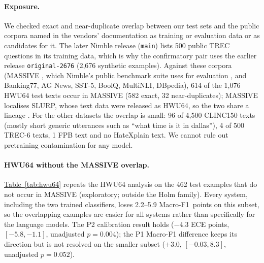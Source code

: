 \paragraph{Exposure.} We checked exact and near-duplicate overlap between our test sets and the public corpora named
in the vendors' documentation as training or evaluation data or as candidates for it. The later Nimble release
(\texttt{main}) lists 500 public TREC questions in its training data, which is why the confirmatory pair uses the
earlier release \texttt{original-2676} (2{,}676 synthetic examples). Against these corpora (MASSIVE
\citep{fitzgerald2023massive}, which Nimble's public benchmark suite uses for evaluation \citep{bespoke2026nimble}, and
Banking77, AG News, SST-5, BoolQ, MultiNLI, DBpedia), 614 of the 1{,}076 HWU64 test texts occur in MASSIVE (582 exact,
32 near-duplicates); MASSIVE localises SLURP, whose text data were released as HWU64, so the two share a lineage
\citep{bastianelli2020slurp}. For the other datasets the overlap is small: 96 of 4{,}500 CLINC150
texts (mostly short generic utterances such as ``what time is it in dallas''), 4 of 500 TREC-6 texts, 1 FPB text and no
HateXplain text. We cannot rule out pretraining contamination for any model.

\paragraph{HWU64 without the MASSIVE overlap.} \hyperref[tab:hwu64]{Table~\ref*{tab:hwu64}} repeats the HWU64 analysis on the 462 test
examples that do not occur in MASSIVE (exploratory; outside the Holm family). Every system, including the two trained
classifiers, loses 2.2--5.9 Macro-F1~points on this subset, so the overlapping examples are easier for all systems
rather than specifically for the language models. The P2 calibration result holds ($-4.3$ ECE points,
$[-5.8,-1.1]$, unadjusted $p=0.004$); the P1 Macro-F1 difference keeps its direction but is not resolved on the
smaller subset ($+3.0$, $[-0.03, 8.3]$, unadjusted $p=0.052$).

\begin{table}[htbp]
  \centering
  \caption{\textbf{Removing the HWU64 examples that also occur in MASSIVE lowers every system's Macro-F1 but leaves the
  P2 calibration result intact.} Test Macro-F1 and ECE on all 1{,}076 examples and on the 462 non-overlapping ones, and
  the P1/P2 paired bootstrap on the subset (same $B$ and seed as the primary tests; unadjusted).}
  \label{tab:hwu64}
  \scriptsize
  
\end{table}

